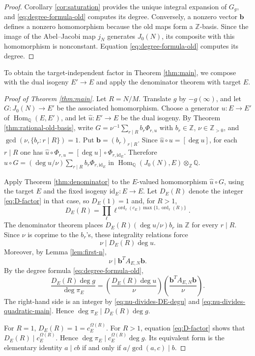 \documentclass[12pt, letterpaper]{amsart}
\theoremstyle{definition}
\theoremstyle{remark}
\newcommand{\Q}{\mathbb Q}
\newcommand{\Z}{\mathbb Z}
\newcommand{\Hom}{\operatorname{Hom}}
\DeclareMathOperator{\ord}{ord}
\numberwithin{equation}{section}
\begin{document}
\begin{proof}
Corollary \ref{cor:saturation} provides the unique integral expansion of \(G_g\),
and \eqref{eq:degree-formula-old} computes its degree. Conversely, a
nonzero vector \(\boldsymbol b\) defines a nonzero homomorphism because the old
maps form a \(\Z\)-basis. Since the image of the Abel--Jacobi map
\(j_N\)
generates \(J_0(N)\), its composite with this homomorphism is nonconstant.
Equation \eqref{eq:degree-formula-old} computes its degree.
\end{proof}

To obtain the target-independent factor in Theorem \ref{thm:main}, we
compose with the dual isogeny \(E'\to E\) and apply the denominator theorem
with target \(E\).

\begin{proof}[Proof of Theorem \ref{thm:main}]
Let \(R=N/M\). Translate \(g\) by \(-g(\infty)\), and let
\(G:J_0(N)\to E'\) be the associated homomorphism. Choose a generator
\(u:E\to E'\) of \(\Hom_\Q(E,E')\), and let \(\widehat u:E'\to E\) be the dual
isogeny. By Theorem \ref{thm:rational-old-basis}, write
\(G=\nu^{-1}\sum_{r\mid R}b_r\Phi_{r,u}\) with \(b_r\in\Z\),
\(\nu\in\Z_{>0}\), and
\(\gcd(\nu,\{b_r:r\mid R\})=1\).
Put \(\boldsymbol b=(b_r)_{r\mid R}\).
Since \(\widehat u\circ u=[\deg u]\), for each
\(r\mid R\) one has
\(\widehat u\circ\Phi_{r,u}=[\deg u]\circ\Phi_{r,\mathrm{id}_E}\). Therefore
\(\widehat u\circ G=(\deg u/\nu)\sum_{r\mid R}b_r\Phi_{r,\mathrm{id}_E}\) in
\(\Hom_\Q(J_0(N),E)\otimes_\Z\Q\).

Apply Theorem \ref{thm:denominator} to the \(E\)-valued homomorphism
\(\widehat u\circ G\), using the target \(E\) and the fixed isogeny
\(\mathrm{id}_E:E\to E\).
Let \(D_E(R)\) denote the integer \eqref{eq:D-factor} in that case, so
\(D_E(1)=1\) and, for \(R>1\),
\[
        D_E(R)=
        \prod_{\ell}\ell^{\ord_\ell(c_E)\max\{1,\ord_\ell(R)\}}.
\]
The denominator theorem places \(D_E(R)(\deg u/\nu)b_r\) in \(\Z\) for every
\(r\mid R\). Since \(\nu\) is coprime to the \(b_r\)'s, these integrality
relations force
\begin{equation}\label{eq:nu-divides-DE-degu}
        \nu\mid D_E(R)\deg u.
\end{equation}
Moreover, by Lemma \ref{lem:first-n},
\begin{equation}\label{eq:nu-divides-quadratic-main}
        \nu\mid\boldsymbol{b}^{T}A_{E,N}\boldsymbol{b}.
\end{equation}
By the degree formula \eqref{eq:degree-formula-old},
\[
        \frac{D_E(R)\deg g}{\deg\pi_E}
        =
        \left(\frac{D_E(R)\deg u}{\nu}\right)
        \left(\frac{\boldsymbol{b}^{T}A_{E,N}\boldsymbol{b}}{\nu}\right).
\]
The right-hand side is an integer by \eqref{eq:nu-divides-DE-degu} and
\eqref{eq:nu-divides-quadratic-main}. Hence
\(\deg\pi_E\mid D_E(R)\deg g\).

For \(R=1\), \(D_E(R)=1=c_E^{\Omega(R)}\). For \(R>1\), equation
\eqref{eq:D-factor} shows that \(D_E(R)\mid c_E^{\Omega(R)}\). Hence
\(\deg\pi_E\mid c_E^{\Omega(R)}\deg g\). Its equivalent form is the elementary
identity \(a\mid cb\) if and only if
\(a/\gcd(a,c)\mid b\).
\end{proof}
\end{document}
